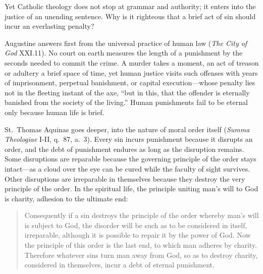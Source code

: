 Yet Catholic theology does not stop at grammar and authority; it enters into the justice of an unending sentence. Why is it righteous that a brief act of sin should incur an everlasting penalty?

Augustine answers first from the universal practice of human law (\textit{The City of God} XXI.11). No court on earth measures the length of a punishment by the seconds needed to commit the crime. A murder takes a moment, an act of treason or adultery a brief space of time, yet human justice visits such offenses with years of imprisonment, perpetual banishment, or capital execution---whose penalty lies not in the fleeting instant of the axe, ``but in this, that the offender is eternally banished from the society of the living.'' Human punishments fail to be eternal only because human life is brief.

St.\ Thomas Aquinas goes deeper, into the nature of moral order itself (\textit{Summa Theologiae} I-II, q.\ 87, a.\ 3). Every sin incurs punishment because it disrupts an order, and the debt of punishment endures as long as the disruption remains. Some disruptions are reparable because the governing principle of the order stays intact---as a cloud over the eye can be cured while the faculty of sight survives. Other disruptions are irreparable in themselves because they destroy the very principle of the order. In the spiritual life, the principle uniting man's will to God is charity, adhesion to the ultimate end:

\begin{quote}
Consequently if a sin destroys the principle of the order whereby man's will is subject to God, the disorder will be such as to be considered in itself, irreparable, although it is possible to repair it by the power of God. Now the principle of this order is the last end, to which man adheres by charity. Therefore whatever sins turn man away from God, so as to destroy charity, considered in themselves, incur a debt of eternal punishment.
\end{quote}

